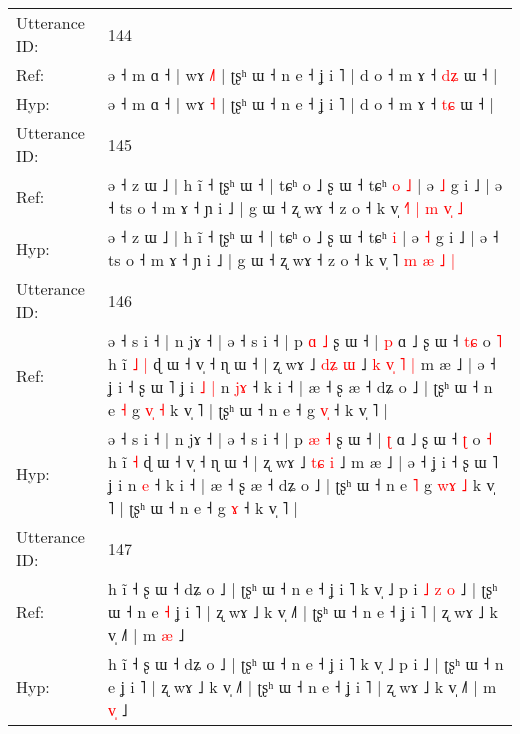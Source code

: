 \documentclass[10pt]{article}
\DeclareRobustCommand{\hl}[1]{{\textcolor{red}{#1}}}
\begin{document}
\begin{longtable}{ll}
 \\
\midrule
Utterance ID: & 144 \\
Ref: & ə ˧ m ɑ ˧ | wɤ \hl{˩}\hl{˥} | ʈʂʰ ɯ ˧ n e ˧ ʝ i ˥ | d o ˧ m ɤ ˧ \hl{d}\hl{ʑ} ɯ ˧ |
 \\
Hyp: & ə ˧ m ɑ ˧ | wɤ \hl{}\hl{˧} | ʈʂʰ ɯ ˧ n e ˧ ʝ i ˥ | d o ˧ m ɤ ˧ \hl{t}\hl{ɕ} ɯ ˧ |
 \\
\midrule
Utterance ID: & 145 \\
Ref: & ə ˧ z ɯ ˩ | h ĩ ˧ ʈʂʰ ɯ ˧ | tɕʰ o ˩ ʂ ɯ ˧ tɕʰ\hl{ }\hl{o} \hl{˩} | ə \hl{˩} g i ˩ | ə ˧ ts o ˧ m ɤ ˧ ɲ i ˩ | g ɯ ˧ ʐ wɤ ˧ z o ˧ k v̩ \hl{˧}˥ \hl{|} \hl{m} \hl{v}\hl{̩} \hl{˩}
 \\
Hyp: & ə ˧ z ɯ ˩ | h ĩ ˧ ʈʂʰ ɯ ˧ | tɕʰ o ˩ ʂ ɯ ˧ tɕʰ\hl{}\hl{} \hl{i} | ə \hl{˧} g i ˩ | ə ˧ ts o ˧ m ɤ ˧ ɲ i ˩ | g ɯ ˧ ʐ wɤ ˧ z o ˧ k v̩ \hl{}˥ \hl{m} \hl{æ} \hl{}\hl{˩} \hl{|}
 \\
\midrule
Utterance ID: & 146 \\
Ref: & ə ˧ s i ˧ | n jɤ ˧ | ə ˧ s i ˧ | p \hl{ɑ} \hl{˩} ʂ ɯ ˧ | \hl{p} ɑ ˩ ʂ ɯ ˧ \hl{t}\hl{ɕ} o \hl{˥} h ĩ\hl{ }\hl{˩} \hl{|} ɖ ɯ ˧ v̩ ˧ ɳ ɯ ˧ | ʐ wɤ ˩ \hl{d}\hl{ʑ} \hl{ɯ} ˩\hl{ }\hl{k}\hl{ }\hl{v}\hl{̩}\hl{ }\hl{˥}\hl{ }\hl{|} m æ ˩ | ə ˧ ʝ i ˧ ʂ ɯ ˥ ʝ i\hl{ }\hl{˩}\hl{ }\hl{|} n \hl{j}\hl{ɤ} ˧ k i ˧ | æ ˧ ʂ æ ˧ dʑ o ˩ | ʈʂʰ ɯ ˧ n e \hl{˧} g \hl{v}\hl{̩} \hl{˧} k v̩ ˥ | ʈʂʰ ɯ ˧ n e ˧ g \hl{v}\hl{̩} ˧ k v̩ ˥ |
 \\
Hyp: & ə ˧ s i ˧ | n jɤ ˧ | ə ˧ s i ˧ | p \hl{æ} \hl{˧} ʂ ɯ ˧ | \hl{ʈ} ɑ ˩ ʂ ɯ ˧ \hl{}\hl{ʈ} o \hl{˧} h ĩ\hl{}\hl{} \hl{˧} ɖ ɯ ˧ v̩ ˧ ɳ ɯ ˧ | ʐ wɤ ˩ \hl{t}\hl{ɕ} \hl{i} ˩\hl{}\hl{}\hl{}\hl{}\hl{}\hl{}\hl{}\hl{}\hl{} m æ ˩ | ə ˧ ʝ i ˧ ʂ ɯ ˥ ʝ i\hl{}\hl{}\hl{}\hl{} n \hl{}\hl{e} ˧ k i ˧ | æ ˧ ʂ æ ˧ dʑ o ˩ | ʈʂʰ ɯ ˧ n e \hl{˥} g \hl{w}\hl{ɤ} \hl{˩} k v̩ ˥ | ʈʂʰ ɯ ˧ n e ˧ g \hl{}\hl{ɤ} ˧ k v̩ ˥ |
 \\
\midrule
Utterance ID: & 147 \\
Ref: & h ĩ ˧ ʂ ɯ ˧ dʑ o ˩ | ʈʂʰ ɯ ˧ n e ˧ ʝ i ˥ k v̩ ˩ p i\hl{ }\hl{˩}\hl{ }\hl{z}\hl{ }\hl{o} ˩ | ʈʂʰ ɯ ˧ n e\hl{ }\hl{˧} ʝ i ˥ | ʐ wɤ ˩ k v̩ ˩˥ | ʈʂʰ ɯ ˧ n e ˧ ʝ i ˥ | ʐ wɤ ˩ k v̩ ˩˥ | m \hl{}\hl{æ} ˩
 \\
Hyp: & h ĩ ˧ ʂ ɯ ˧ dʑ o ˩ | ʈʂʰ ɯ ˧ n e ˧ ʝ i ˥ k v̩ ˩ p i\hl{}\hl{}\hl{}\hl{}\hl{}\hl{} ˩ | ʈʂʰ ɯ ˧ n e\hl{}\hl{} ʝ i ˥ | ʐ wɤ ˩ k v̩ ˩˥ | ʈʂʰ ɯ ˧ n e ˧ ʝ i ˥ | ʐ wɤ ˩ k v̩ ˩˥ | m \hl{v}\hl{̩} ˩
 \\
\midrule
\end{longtable}
\end{document}
